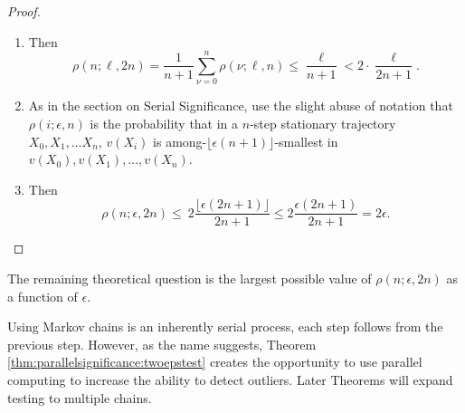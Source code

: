 \documentclass[12pt]{article}
\begin{document}
\begin{proof}
\begin{enumerate}
            is among-\( \ell \)-smallest from \( v(X_0), \dots, v(X_n) \),
            so
            \begin{equation}
                \label{eq:parallelsignificance:eqn1} \sum_{\nu=0}^n \rho
                (\nu; \ell, n) \le \ell.
            \end{equation}
            (The proof of the next theorem also uses this inequality.)
        \item
            Then
            \[
                \rho(n; \ell, 2n) = \frac{1}{n+1} \sum_{\nu=0}^n \rho(\nu;
                \ell, n) \le \frac{\ell}{n+1} < 2 \cdot \frac{\ell} {2n+1}.
            \]
        \item
            As in the section on Serial Significance, use the slight
            abuse of notation that \( \rho(i; \epsilon, n) \) is the
            probability that in a \( n \)-step stationary trajectory \(
            X_0, X_1, \dots X_n \), \( v(X_i) \) is among-\( \lfloor
            \epsilon(n+1) \rfloor \)-smallest in \( v(X_0), v(X_1),
            \dots, v(X_n) \).
        \item
            Then
            \[
                \rho(n; \epsilon, 2n) \le \ 2 \frac{ \lfloor \epsilon (2n+1)
                \rfloor}{2n+1} \le 2 \frac{ \epsilon (2n+1)}{2n+1} = 2\epsilon.
            \]
    \end{enumerate}
\end{proof}

\begin{remark}
    The remaining theoretical question is the largest possible value of \(
    \rho(n; \epsilon, 2n) \) as a function of \( \epsilon \).
\end{remark}

\begin{remark}
    Using Markov chains is an inherently serial process, each step
    follows from the previous step.  However, as the name suggests,
    Theorem~%
    \ref{thm:parallelsignificance:twoepstest} creates the opportunity to
    use parallel computing to increase the ability to detect outliers.
    Later Theorems will expand testing to multiple chains.
\end{remark}
\end{document}

